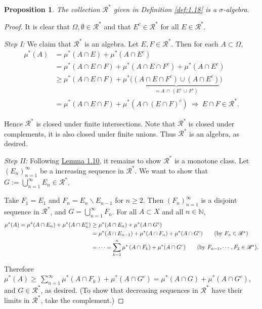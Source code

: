 \documentclass{article}
\numberwithin{equation}{section}
\theoremstyle{plain}
\newtheorem{proposition}[theorem]{Proposition}
\theoremstyle{definition}
\begin{document}
\begin{proposition}\label{prop:1.19} The collection $\mathscr{R}^*$ given in Definition \ref{def:1.18} is a $\sigma$-algebra.
\end{proposition}
\begin{proof}
It is clear that $\Omega,\emptyset\in\mathscr{R}^*$ and that $E^c\in\mathscr{R}^*$ for all $E\in\mathscr{R}^*$.

\item \textit{Step I:} We claim that $\mathscr{R}^*$ is an algebra. Let $E,F\in\mathscr{R}^*$. Then for each $A\subset\Omega$,
\begin{align*}
	\mu^*(A) &= \mu^*(A\cap E)+\mu^*(A\cap E^c)\\
	&= \mu^*(A\cap E\cap F) + \mu^*(A\cap E\cap F^c)+\mu^*(A\cap E^c)\\
	&\geq \mu^*(A\cap E\cap F) + \mu^*\bigl(\underbrace{(A\cap E\cap F^c)\cup(A\cap E^c)}_{=A\,\cap\,(E^c\,\cup\,F^c)}\bigr)\tag{By subadditivity of $\mu^*$}\\
	&= \mu^*(A\cap E\cap F) + \mu^*(A\cap (E\cap F)^c) \ \Rightarrow\ E\cap F\in\mathscr{R}^*.
\end{align*}

Hence $\mathscr{R}^*$ is closed under finite intersections. Note that $\mathscr{R}^*$ is closed under complements, it is also closed under finite unions. Thus $\mathscr{R}^*$ is an algebra, as desired.

\item \textit{Step II:} Following \hyperref[lemma:1.10]{Lemma 1.10}, it remains to show $\mathscr{R}^*$ is a monotone class. Let $(E_n)_{n=1}^\infty$ be a increasing sequence in $\mathscr{R}^*$. We want to show that $G:=\bigcup_{n=1}^\infty E_n\in\mathscr{R}^*$.

Take $F_1=E_1$ and $F_n=E_n\backslash E_{n-1}$ for $n\geq 2$. Then $(F_n)_{n=1}^\infty$ is a disjoint sequence in $\mathscr{R}^*$, and $G=\bigcup_{n=1}^\infty F_n$. For all $A\subset X$ and all $n\in\mathbb{N}$,
\begin{align*}
	\mu^*(A) = \mu^*(A\cap E_n) + \mu^*(A\cap E_n^c) &\geq \mu^*(A\cap E_n) + \mu^*(A\cap G^c)\\
	&=\mu^*(A\cap E_{n-1}) + \mu^*(A\cap F_n) + \mu^*(A\cap G^c) \tag{by $F_n\in\mathscr{R}^*$}\\
	&=\cdots =\sum_{k=1}^n\mu^*\left(A\cap F_k\right) + \mu^*(A\cap G^c)\tag{by $F_{n-1},\cdots,F_2\in\mathscr{R}^*$}.
\end{align*}

Therefore $\mu^*(A)\geq\,\sum_{n=1}^\infty\mu^*(A\cap F_k)+\mu^*(A\cap G^c) = \mu^*(A\cap G)+\mu^*(A\cap G^c)$, and $G\in\mathscr{R}^*$, as desired. (To show that decreasing sequences in $\mathscr{R}^*$ have their limits in $\mathscr{R}^*$, take the complement.)
\end{proof}
\end{document}
